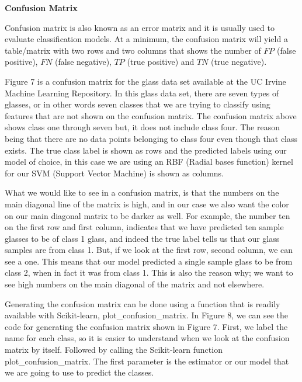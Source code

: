 \documentclass[a4paper,12pt]{report}
\newcommand{\msection}[1]{\noindent\textbf{#1}}
\begin{document}

\msection{Confusion Matrix}

Confusion matrix is also known as an error matrix and it is usually used to evaluate classification models. At a minimum, the confusion matrix will yield a table/matrix with two rows and two columns that shows the number of $FP$ (false positive), $FN$ (false negative), $TP$ (true positive) and $TN$ (true negative).

 
Figure 7 is a confusion matrix for the glass data set available at the UC Irvine Machine Learning Repository. In this glass data set, there are seven types of glasses, or in other words seven classes that we are trying to classify using features that are not shown on the confusion matrix. The confusion matrix above shows class one through seven but, it does not include class four. The reason being that there are no data points belonging to class four even though that class exists. The true class label is shown as rows and the predicted labels using our model of choice, in this case we are using an RBF (Radial bases function) kernel for our SVM (Support Vector Machine) is shown as columns.

What we would like to see in a confusion matrix, is that the numbers on the main diagonal line of the matrix is high, and in our case we also want the color on our main diagonal matrix to be darker as well. For example, the number ten on the first row and first column, indicates that we have predicted ten sample glasses to be of class 1 glass, and indeed the true label tells us that our glass samples are from class 1. But, if we look at the first row, second column, we can see a one. This means that our model predicted a single sample glass to be from class 2, when in fact it was from class 1. This is also the reason why; we want to see high numbers on the main diagonal of the matrix and not elsewhere.


Generating the confusion matrix can be done using a function that is readily available with Scikit-learn, plot\_confusion\_matrix. In Figure 8, we can see the code for generating the confusion matrix shown in Figure 7. First, we label the name for each class, so it is easier to understand when we look at the confusion matrix by itself. Followed by calling the Scikit-learn function plot\_confusion\_matrix. The first parameter is the estimator or our model that we are going to use to predict the classes.
\end{document}
